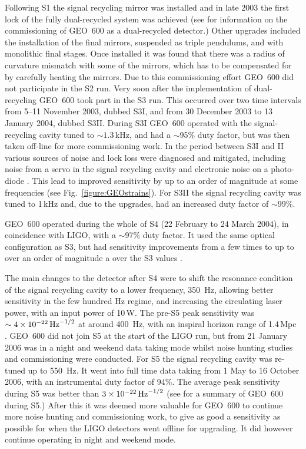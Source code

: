 \documentclass{article}
\begin{document}
Following S1 the signal recycling mirror was installed and in late 2003 the
first lock of the fully dual-recycled system was achieved (see
\cite{Smith:2004, Willke:2004, Grote:2005} for information on the commissioning
of GEO~600 as a dual-recycled detector.) Other upgrades included the
installation of the final mirrors, suspended as triple pendulums, and with
monolithic final stages. Once installed it was found that there was a radius of
curvature mismatch with some of the mirrors, which has to be compensated for by
carefully heating the mirrors. Due to this commissioning effort GEO~600 did not
participate in the S2 run. Very soon after the implementation of dual-recycling
GEO~600 took part in the S3 run. This occurred over two time intervals
from 5--11 November 2003, dubbed S3I, and from 30 December 2003 to 13 January
2004, dubbed S3II. During S3I GEO~600 operated with the signal-recycling
cavity tuned to $\sim 1.3$\,kHz, and had a $\sim$95\% duty factor, but was then
taken off-line for more commissioning work. In the period between S3I and II
various sources of noise and lock loss were diagnosed and mitigated, including
noise from a servo in the signal recycling cavity and electronic noise on a
photo-diode \cite{Smith:2004}. This lead to improved sensitivity by up to an
order of magnitude at some frequencies (see Fig.~\ref{figure:GEOstrains}). For
S3II the signal recycling cavity was tuned to 1\,kHz and, due to the upgrades,
had an increased duty factor of $\sim$99\%.

GEO~600 operated during the whole of S4 (22 February to 24 March 2004), in
coincidence with LIGO, with a $\sim$97\% duty factor. It used the same optical
configuration as S3, but had sensitivity improvements from a few times to up
to over an order of magnitude a over the S3 values \cite{Hild:2006a}.

The main changes to the detector after S4 were to shift the resonance condition
of the signal recycling cavity to a lower frequency, 350~Hz, allowing better
sensitivity in the few hundred Hz regime, and increasing the circulating laser
power, with an input power of 10\,W. The pre-S5 peak sensitivity was
$\sim4\times10^{-22}\,{\rm Hz}^{-1/2}$ at around 400~Hz, with an inspiral
horizon range of 1.4\,Mpc \cite{Hild:2006b}. GEO~600 did not join S5 at the
start of the LIGO run, but from 21 January 2006 was in a night and weekend data
taking mode whilst noise hunting studies and commissioning were conducted. For
S5 the signal recycling cavity was re-tuned up to 550~Hz. It went into full time
data taking from 1 May to 16 October 2006, with an instrumental duty factor of
94\%. The average peak sensitivity during S5 was better than
$3\times10^{-22}\,{\rm Hz}^{-1/2}$ (see \cite{Willke:2007} for a summary of
GEO~600 during S5.) After this it was deemed more valuable for GEO~600 to
continue more noise hunting and commissioning work, to give as good a
sensitivity as possible for when the LIGO detectors went offline for upgrading.
It did however continue operating in night and weekend mode.
\end{document}
